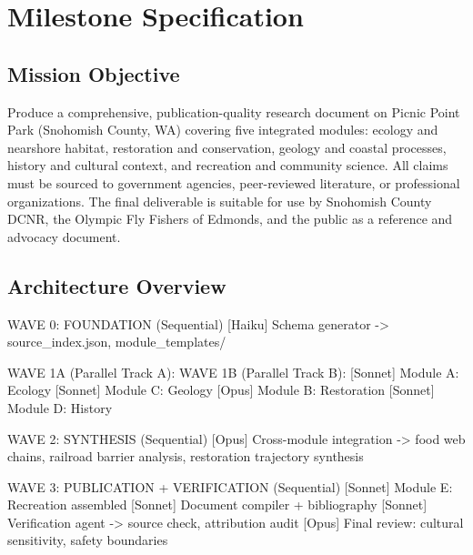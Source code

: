 \documentclass[11pt,letterpaper]{article}
\newcommand{\stageheader}[2]{%
  \noindent\colorbox{#2}{\makebox[\textwidth][l]{%
    \textcolor{white}{\bfseries\sffamily\hspace{6pt}#1\hspace{6pt}}}}%
  \vspace{0.5em}\par%
}
\begin{document}
\newpage
\stageheader{STAGE 3 --- MISSION PACKAGE}{tertiary}

\section{Milestone Specification}

\subsection{Mission Objective}

Produce a comprehensive, publication-quality research document on Picnic Point Park (Snohomish County, WA) covering five integrated modules: ecology and nearshore habitat, restoration and conservation, geology and coastal processes, history and cultural context, and recreation and community science. All claims must be sourced to government agencies, peer-reviewed literature, or professional organizations. The final deliverable is suitable for use by Snohomish County DCNR, the Olympic Fly Fishers of Edmonds, and the public as a reference and advocacy document.

\subsection{Architecture Overview}

\begin{asciibox}
WAVE 0: FOUNDATION (Sequential)
  [Haiku] Schema generator -> source_index.json, module_templates/

WAVE 1A (Parallel Track A):              WAVE 1B (Parallel Track B):
  [Sonnet] Module A: Ecology             [Sonnet] Module C: Geology
  [Opus]   Module B: Restoration         [Sonnet] Module D: History

WAVE 2: SYNTHESIS (Sequential)
  [Opus] Cross-module integration
       -> food web chains, railroad barrier analysis,
          restoration trajectory synthesis

WAVE 3: PUBLICATION + VERIFICATION (Sequential)
  [Sonnet] Module E: Recreation assembled
  [Sonnet] Document compiler + bibliography
  [Sonnet] Verification agent -> source check, attribution audit
  [Opus]   Final review: cultural sensitivity, safety boundaries
\end{asciibox}
\end{document}
